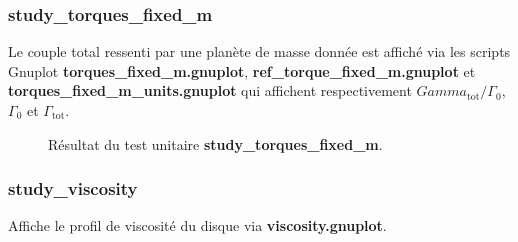 \subsubsection{study\_torques\_fixed\_m}
Le couple total ressenti par une planète de masse donnée est affiché via les scripts Gnuplot \textbf{torques\_fixed\_m.gnuplot}, \textbf{ref\_torque\_fixed\_m.gnuplot} et \textbf{torques\_fixed\_m\_units.gnuplot} qui affichent respectivement $Gamma_\text{tot}/\Gamma_0$, $\Gamma_0$ et $\Gamma_\text{tot}$.

\begin{figure}[htbp]
\centering
{}\hfill
{}

\caption{Résultat du test unitaire \textbf{study\_torques\_fixed\_m}.}
\end{figure}

\subsubsection{study\_viscosity}
Affiche le profil de viscosité du disque via \textbf{viscosity.gnuplot}.

